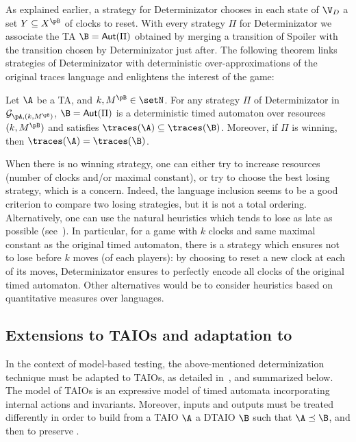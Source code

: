 \documentclass{LMCS}
\theoremstyle{plain}\newtheorem{proposition}[thm]{Proposition}
\begin{document}
As explained earlier, a strategy for Determinizator chooses in each
state of $\V_D$ a set $Y \subseteq X^\pB$ of clocks to reset.  With
every strategy $\Pi$ for Determinizator we associate the TA
$\B=\mathsf{Aut}(\Pi)$ obtained by merging a transition of Spoiler
with the transition chosen by Determinizator just after.  The
following theorem links strategies of Determinizator with
deterministic over-approximations of the original traces language and
enlightens the interest of the game:
\begin{thm}
\label{th:game}Let $\A$ be a TA, and $k,M^\pB \in \setN$. For any
strategy $\Pi$ of Determinizator in
$\mathcal{G}_{\pA,(k,M^\pB)}$, $\B=\mathsf{Aut}(\Pi)$ is a
deterministic timed automaton over resources $(k,M^\pB)$ and satisfies
$\traces(\A)\subseteq \traces(\B)$. 
Moreover, if $\Pi$ is winning, then
$\traces(\A) =
\traces(\B)$.
\end{thm}
When there is no winning strategy, one can either try to increase
  resources (number of clocks and/or maximal constant), or try to
  choose the best losing strategy, which is a concern.  Indeed, the
  language inclusion seems to be a good criterion to compare two
  losing strategies, but it is not a total ordering.  Alternatively,
  one can use the natural heuristics which tends to lose as late as
  possible (see~\cite{BertrandStainerJeronKrichen-RR2010}).  In
  particular, for a game with $k$ clocks and same maximal constant as
  the original timed automaton, there is a strategy which ensures not
  to lose before $k$ moves (of each players): by choosing to reset a
  new clock at each of its moves, Determinizator ensures 
to perfectly  encode all clocks of the original timed automaton. 
Other
  alternatives would be to consider heuristics based on quantitative
  measures over languages.


\subsection{Extensions to TAIOs and adaptation to \tioco}
In the context of model-based testing, the above-mentioned
determinization technique must be adapted to TAIOs, as detailed
in~\cite{BertrandStainerJeronKrichen-RR2010}, and summarized below.  
The model of TAIOs
is an expressive model of timed automata incorporating internal actions and
invariants.  
Moreover, inputs and outputs must be treated differently
in order to build
from a TAIO $\A$ a DTAIO $\B$ such that $\A \preceq \B$,
and then to preserve \tioco.
\end{document}
